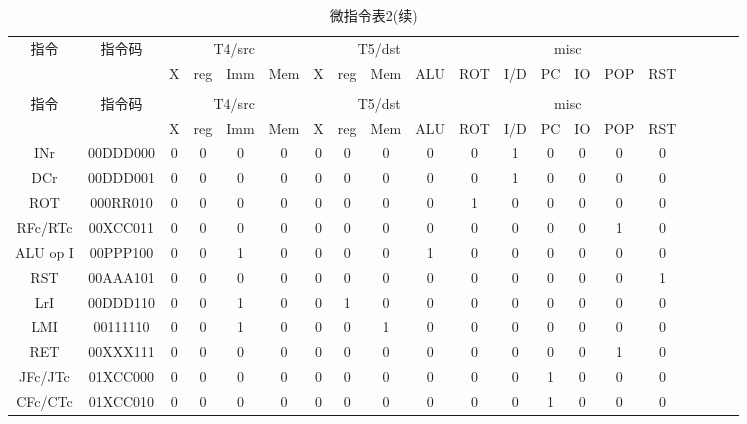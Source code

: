 \documentclass[10pt]{book}
\begin{document}
\begin{longtable}{|c|c|c|c|c|c|c|c|c|c|c|c|c|c|c|c|c|c|c|c|}
\caption{操作编码} \label{tb_micro_op} \\
\hline
\multirow{2}{1.5cm}{指令} & \multirow{2}{1.5cm}{指令码} & \multicolumn{4}{c|}{T4/src} & \multicolumn {4}{c|}{T5/dst} & \multicolumn {6}{c|}{misc} \\
\cline{3-18}
  &  &  X & reg & Imm & Mem &  X & reg & Mem & ALU &  ROT & I/D & PC & IO & POP & RST \\
\hline
\endfirsthead
\caption{微指令表2(续)} \\
\hline
\multirow{2}{1.5cm}{指令} & \multirow{2}{1.5cm}{指令码} & \multicolumn{4}{c|}{T4/src} & \multicolumn {4}{c|}{T5/dst} & \multicolumn {6}{c|}{misc} \\
\cline{3-18}
  &  &  X & reg & Imm & Mem &  X & reg & Mem & ALU &  ROT & I/D & PC & IO & POP & RST \\
\hline
\endhead
\hline
\endfoot
INr		& 00DDD000 &  0 & 0   & 0   & 0   &  0 & 0   & 0   & 0   &  0   & 1   & 0  & 0  & 0   & 0 \\
DCr		& 00DDD001 &  0 & 0   & 0   & 0   &  0 & 0   & 0   & 0   &  0   & 1   & 0  & 0  & 0   & 0 \\
ROT		& 000RR010 &  0 & 0   & 0   & 0   &  0 & 0   & 0   & 0   &  1   & 0   & 0  & 0  & 0   & 0 \\
RFc/RTc	& 00XCC011 &  0 & 0   & 0   & 0   &  0 & 0   & 0   & 0   &  0   & 0   & 0  & 0  & 1   & 0 \\
ALU op I 	& 00PPP100 &  0 & 0   & 1   & 0   &  0 & 0   & 0   & 1   &  0   & 0   & 0  & 0  & 0   & 0 \\
RST		& 00AAA101 &  0 & 0   & 0   & 0   &  0 & 0   & 0   & 0   &  0   & 0   & 0  & 0  & 0   & 1 \\
LrI		& 00DDD110 &  0 & 0   & 1   & 0   &  0 & 1   & 0   & 0   &  0   & 0   & 0  & 0  & 0   & 0 \\
LMI		& 00111110 &  0 & 0   & 1   & 0   &  0 & 0   & 1   & 0   &  0   & 0   & 0  & 0  & 0   & 0 \\
RET		& 00XXX111 &  0 & 0   & 0   & 0   &  0 & 0   & 0   & 0   &  0   & 0   & 0  & 0  & 1   & 0 \\
\hline
JFc/JTc	& 01XCC000 &  0 & 0   & 0   & 0   &  0 & 0   & 0   & 0   &  0   & 0   & 1  & 0  & 0   & 0 \\
CFc/CTc	& 01XCC010 &  0 & 0   & 0   & 0   &  0 & 0   & 0   & 0   &  0   & 0   & 1  & 0  & 0   & 0 \\

\end{longtable}
\end{document}
